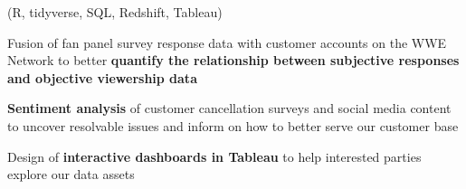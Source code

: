 \begin{itemize*}
    {\small{(R, tidyverse, SQL, Redshift, Tableau)}}
    \begin{itemize*}
      \item Fusion of fan panel survey response data with customer accounts on the
        WWE Network to better \textbf{quantify the relationship between
        subjective responses and objective viewership data}
      \item \textbf{Sentiment analysis} of customer cancellation surveys
        and social media content to uncover resolvable issues and inform on
        how to better serve our customer base
      \item Design of \textbf{interactive dashboards in Tableau} to help interested
        parties explore our data assets
    \end{itemize*}
\end{itemize*}


